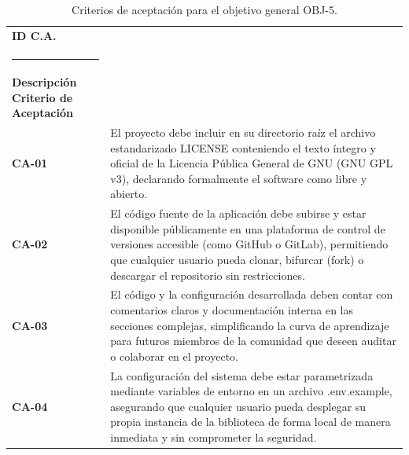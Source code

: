 \begin{table}[H]
	\centering
	\caption{Criterios de aceptación para el objetivo general OBJ-5.}
	\label{tab:criterios_aceptacion_normal05}
	\begin{tabularx}{\textwidth}{l X}
		\toprule
		\textbf{ID C.A.} & 
		\begin{minipage}[t]{\linewidth}
			\textbf{ID Objetivo asociado: OBJ-5 <Fomentar el \textit{software} libre>} \\[2pt]
			\rule{\linewidth}{0.4pt} \\[2pt]
			\textbf{Descripción Criterio de Aceptación}
		\end{minipage} \\
		\midrule
		\textbf{CA-01} & El proyecto debe incluir en su directorio raíz el archivo estandarizado LICENSE conteniendo el texto íntegro y oficial de la Licencia Pública General de GNU (GNU GPL v3), declarando formalmente el software como libre y abierto. \\
		\addlinespace
		\textbf{CA-02} & El código fuente de la aplicación debe subirse y estar disponible públicamente en una plataforma de control de versiones accesible (como GitHub o GitLab), permitiendo que cualquier usuario pueda clonar, bifurcar (fork) o descargar el repositorio sin restricciones. \\
		\addlinespace
		\textbf{CA-03} & El código y la configuración desarrollada deben contar con comentarios claros y documentación interna en las secciones complejas, simplificando la curva de aprendizaje para futuros miembros de la comunidad que deseen auditar o colaborar en el proyecto. \\
		\addlinespace
		\textbf{CA-04} & La configuración del sistema debe estar parametrizada mediante variables de entorno en un archivo .env.example, asegurando que cualquier usuario pueda desplegar su propia instancia de la biblioteca de forma local de manera inmediata y sin comprometer la seguridad. \\
		\bottomrule
	\end{tabularx}	
\end{table}

